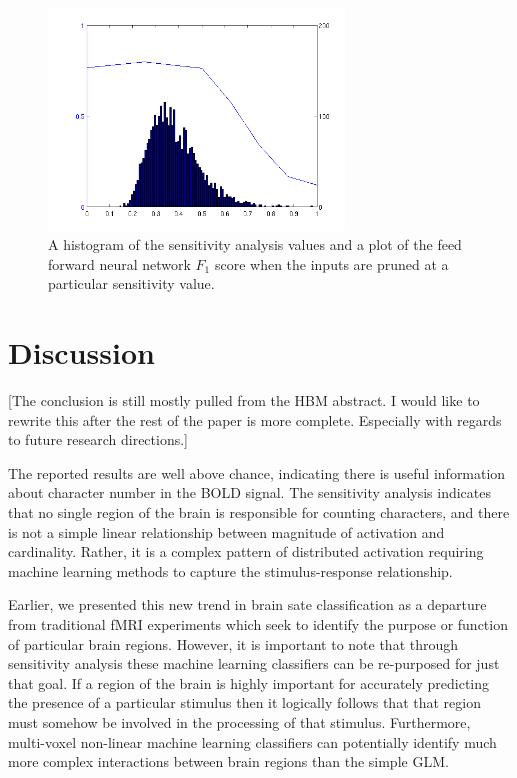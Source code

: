 \documentclass[preprint,authoryear,12pt]{elsarticle}
\begin{document}
\begin{figure}
\centering
\includegraphics[width=0.7\textwidth]{figures/sensitivity-cutoff}
\caption{A histogram of the sensitivity analysis values and a plot of the feed forward neural network $F_1$ score when the inputs are pruned at a particular sensitivity value. }
\label{fig:sensitivity-cutoff}
\end{figure}

\section{Discussion}
[The conclusion is still mostly pulled from the HBM abstract. I would like to rewrite this after the rest of the paper is more complete. Especially with regards to future research directions.]

The reported results are well above chance, indicating there is useful information about character number in the BOLD signal.
The sensitivity analysis indicates that no single region of the brain is responsible for counting characters, and there is not a simple linear relationship between magnitude of activation and cardinality.
Rather, it is a complex pattern of distributed activation requiring machine learning methods to capture the stimulus-response relationship.

Earlier, we presented this new trend in brain sate classification as a departure from traditional fMRI experiments which seek to identify the purpose or function of particular brain regions.
However, it is important to note that through sensitivity analysis these machine learning classifiers can be re-purposed for just that goal.
If a region of the brain is highly important for accurately predicting the presence of a particular stimulus then it logically follows that that region must somehow be involved in the processing of that stimulus.
Furthermore, multi-voxel non-linear machine learning classifiers can potentially identify much more complex interactions between brain regions than the simple GLM.


\end{document}
